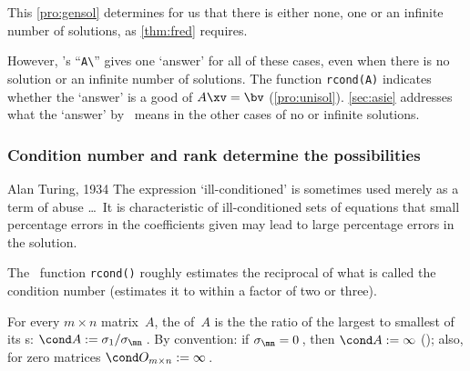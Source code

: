This \autoref{pro:gensol} determines for us that there is either none, one or an infinite number of solutions, as \autoref{thm:fred} requires.

However,  \script's ``\verb|A\|'' gives one `answer' for all of these cases, even when there is no solution or an infinite number of solutions.
The function \verb|rcond(A)| indicates whether the `answer' is a good  of \(A\xv=\bv\) (\autoref{pro:unisol}).
\autoref{sec:asie} addresses what the `answer' by \script\ means in the other cases of no or infinite solutions.





\subsubsection{Condition number and rank determine the possibilities}

\begin{quoted}{Alan Turing, 1934 \cite[p.131]{Higham1996}}
The expression `ill-conditioned' is sometimes used merely as a term of abuse \ldots\ 
It is characteristic of ill-conditioned sets of equations that small percentage errors in the coefficients given may lead to large percentage errors in the solution.
\end{quoted}

The \script\ function \verb|rcond()| roughly estimates the reciprocal of what is called the condition number (estimates it to within a factor of two or three).
\begin{comment}
Avoid introducing \verb|cond()| as it is expensive to compute in practice, and better learning to reinforce the ratio of singular values.
\end{comment}

\begin{definition} \label{def:condnum}
For every \(m\times n\) matrix~\(A\),
the  of~\(A\) is the the ratio of the largest to smallest of its s: \(\cond A:=\sigma_1/\sigma_{\mn}\)\,. 
By convention: if \(\sigma_{\mn}=0\)\,, then \(\cond A:=\infty\) (\idx{infinity}); 
also, for zero matrices \(\cond O_{m\times n}:=\infty\)\,.
\end{definition}

